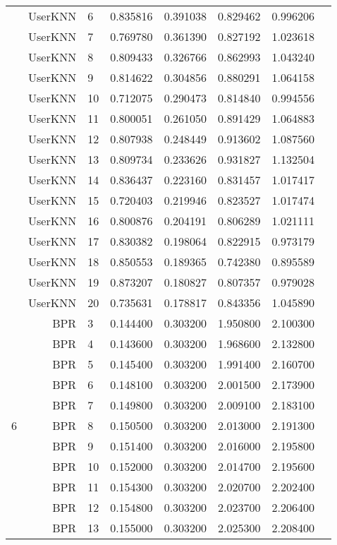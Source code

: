 \documentclass[a4paper,12pt]{article}
\begin{document}
\begin{center}
\begin{longtable}{lrlrrrrr}
& UserKNN & 6 & 0.835816 & 0.391038 & 0.829462 & 0.996206 \\
& UserKNN & 7 & 0.769780 & 0.361390 & 0.827192 & 1.023618 \\
& UserKNN & 8 & 0.809433 & 0.326766 & 0.862993 & 1.043240 \\
& UserKNN & 9 & 0.814622 & 0.304856 & 0.880291 & 1.064158 \\
& UserKNN & 10 & 0.712075 & 0.290473 & 0.814840 & 0.994556 \\
& UserKNN & 11 & 0.800051 & 0.261050 & 0.891429 & 1.064883 \\
& UserKNN & 12 & 0.807938 & 0.248449 & 0.913602 & 1.087560 \\
& UserKNN & 13 & 0.809734 & 0.233626 & 0.931827 & 1.132504 \\
& UserKNN & 14 & 0.836437 & 0.223160 & 0.831457 & 1.017417 \\
& UserKNN & 15 & 0.720403 & 0.219946 & 0.823527 & 1.017474 \\
& UserKNN & 16 & 0.800876 & 0.204191 & 0.806289 & 1.021111 \\
& UserKNN & 17 & 0.830382 & 0.198064 & 0.822915 & 0.973179 \\
& UserKNN & 18 & 0.850553 & 0.189365 & 0.742380 & 0.895589 \\
& UserKNN & 19 & 0.873207 & 0.180827 & 0.807357 & 0.979028 \\
& UserKNN & 20 & 0.735631 & 0.178817 & 0.843356 & 1.045890 \\ \hline
\multirow{18}{1cm}{6} & BPR & 3 & 0.144400 & 0.303200 & 1.950800 & 2.100300 \\
& BPR & 4 & 0.143600 & 0.303200 & 1.968600 & 2.132800 \\
& BPR & 5 & 0.145400 & 0.303200 & 1.991400 & 2.160700 \\
& BPR & 6 & 0.148100 & 0.303200 & 2.001500 & 2.173900 \\
& BPR & 7 & 0.149800 & 0.303200 & 2.009100 & 2.183100 \\
& BPR & 8 & 0.150500 & 0.303200 & 2.013000 & 2.191300 \\
& BPR & 9 & 0.151400 & 0.303200 & 2.016000 & 2.195800 \\
& BPR & 10 & 0.152000 & 0.303200 & 2.014700 & 2.195600 \\
& BPR & 11 & 0.154300 & 0.303200 & 2.020700 & 2.202400 \\
& BPR & 12 & 0.154800 & 0.303200 & 2.023700 & 2.206400 \\
& BPR & 13 & 0.155000 & 0.303200 & 2.025300 & 2.208400 \\

\end{longtable}
\end{center}
\end{document}
